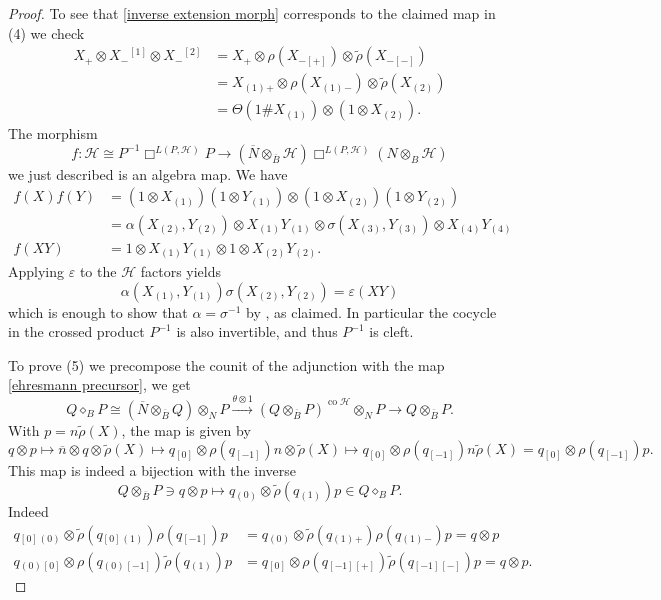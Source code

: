 \documentclass[a4paper,reqno]{amsart}
\numberwithin{equation}{section}
\theoremstyle{plain}
\theoremstyle{remark}
\numberwithin{equation}{section}
\newcommand\inv{^{-1}}
\newcommand{\ot}{\otimes}
\newcommand\ol{\overline}
\newcommand{\yi}[1]{{#1}{}{}^{\scriptscriptstyle{[1]}}}
\newcommand{\er}[1]{{#1}{}{}^{\scriptscriptstyle{[2]}}}
\newcommand{\trho}{{\tilde{\rho}}}
\newcommand{\z}{{}_{\scriptscriptstyle{(0)}}}
\newcommand{\rz}{{}_{\scriptscriptstyle{[0]}}}
\renewcommand{\o}{{}_{\scriptscriptstyle{(1)}}}
\newcommand{\rmo}{{}_{\scriptscriptstyle{[-1]}}}
\renewcommand{\t}{{}_{\scriptscriptstyle{(2)}}}
\renewcommand{\th}{{}_{\scriptscriptstyle{(3)}}}
\newcommand{\fo}{{}_{\scriptscriptstyle{(4)}}}
\newcommand{\di}{{\diamond_{B}}}
\newcommand\ou[1]{\otimes_{#1}}
\newcommand{\CH}{\mathcal{H}}
\newcommand\co{{\operatorname{co}}}
\begin{document}
\begin{proof}
 
    To see that \eqref{inverse extension morph} corresponds to the claimed map in (4) we check
    \begin{align*}
        X_+\ot X_-{}\yi{}\ot X_-{}\er{}
        &=X_+\ot \rho(X_{-[+]})\ot \trho(X_{-[-]})\\
        &=X\o{}_{+}\ot \rho(X\o{}_{-})\ot\trho(X\t)\\
        &=\Theta(1\#X\o )\ot (1\ot X\t).
    \end{align*}
    The morphism  
    \[f\colon \CH\cong P\inv\Box^{L(P,\CH)}P\to (\ol N\ou{\ol B}\CH)\Box^{L(P,\CH)}(N\ou B\CH)\]
    we just described is an algebra map. We have
    \begin{align*}
        f(X)f(Y)&=(1\ot X\o)(1\ot Y\o)\ot (1\ot X\t)(1\ot Y\t)\\
        &=\alpha(X\t,Y\t)\ot X\o Y\o\ot\sigma(X\th,Y\th)\ot X\fo Y\fo\\
        f(XY)&=1\ot X\o Y\o\ot 1\ot X\t Y\t.
    \end{align*}
    Applying $\varepsilon$ to the $\CH$ factors yields \[\alpha(X\o,Y\o)\sigma(X\t,Y\t)=\varepsilon(XY)\]
    which is  enough to show that $\alpha=\sigma\inv$ by , as claimed. In particular the cocycle in the crossed product $P\inv$ is also invertible, and thus $P\inv$ is cleft.

    To prove (5) we precompose the counit of the adjunction with the map \eqref{ehresmann precursor}, we get
    \[Q\di P\cong (\ol N\ou{\ol B}Q)\ou N P\xrightarrow{\theta\ot 1}(Q\ou {\ol B}P)^{\co\CH}\ou NP\rightarrow Q\ou{\ol B}P.\]
    With $p=n\trho(X)$, the map is given by 
    \[q\ot p\mapsto \ol n\ot q\ot \trho(X)\mapsto q\rz\ot\rho(q\rmo)n\ot \trho(X)\mapsto q\rz\ot\rho(q\rmo)n\trho(X)=q\rz\ot\rho(q\rmo)p. \]
    This map is indeed a bijection with the inverse
    \[Q\ou{\ol B}P\ni q\ot p\mapsto q\z\ot \tilde\rho(q\o)p\in Q\di P.\]
    Indeed
    \begin{align*}
        q\rz\z\ot \trho(q\rz\o)\rho(q\rmo)p&=q\z\ot\trho(q\o{}_{+})\rho(q\o{}_{-})p=q\ot p\\
        q\z\rz\ot\rho(q\z\rmo)\trho(q\o)p
        &=q\rz\ot \rho(q\rmo{}_{[+]})\trho(q\rmo{}_{[-]})p=q\ot p.
    \end{align*}
\end{proof}
\end{document}
